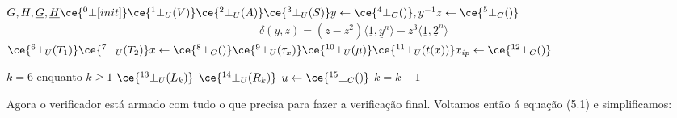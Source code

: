 \newpage
$
G, H, \underline{G}, \underline{H} \hspace*{\fill} \ce{^{0}_{\ }\bot[init]} \newline
\hspace*{\fill} \ce{^{1}_{\ }\bot_U(V)} \newline
\hspace*{\fill} \ce{^{2}_{\ }\bot_U(A)} \newline
\hspace*{\fill} \ce{^{3}_{\ }\bot_U(S)} \newline
y\leftarrow \ce{^{4}_{\ }\bot_C()}, y^{-1} \newline
z\leftarrow \ce{^{5}_{\ }\bot_C()} \newline
$
\begin{align*}
\delta(y,z) = (z - z^2)  \langle \underline{1}, \underline{y}^n \rangle - z^3 \langle \underline{1}, \underline{2}^n \rangle
\end{align*}
$
\hspace*{\fill} \ce{^{6}_{\ }\bot_U(T_1)} \newline
\hspace*{\fill} \ce{^{7}_{\ }\bot_U(T_2)} \newline
x\leftarrow \ce{^{8}_{\ }\bot_C()} \newline
\hspace*{\fill}\ce{^{9}_{\ }\bot_U(\tau_x)} \newline
\hspace*{\fill}\ce{^{10}_{\ }\bot_U(\mu)} \newline
\hspace*{\fill}\ce{^{11}_{\ }\bot_U(t(x))} \newline
x_{ip}\leftarrow \ce{^{12}_{\ }\bot_C()} \newline
$

$k=6$\newline
enquanto $k \geq 1$\newline
$\hspace*{\fill}\ce{^{13}_{\ }\bot_U(L_k)}$ \newline
$\hspace*{\fill}\ce{^{14}_{\ }\bot_U(R_k)}$ \newline
$u\leftarrow \ce{^{15}_{\ }\bot_C()}$ \newline
$k=k-1$

Agora o verificador está armado com tudo o que precisa para fazer a verificação final. Voltamos então á equação (5.1) e simplificamos:\newline


